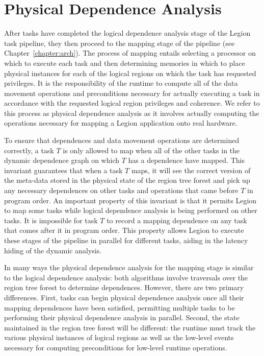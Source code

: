 

\chapter{Physical Dependence Analysis}
\label{chapter:physical}

After tasks have completed the logical dependence
analysis stage of the Legion task pipeline, they
then proceed to the mapping stage of the pipeline
(see Chapter~\ref{chapter:arch}). The process
of mapping entails selecting a processor on which
to execute each task and then determining memories
in which to place physical instances for each
of the logical regions on which the task has requested
privileges. It is the responsibility of the runtime
to compute all of the data movement operations and
preconditions necessary for actually executing a
task in accordance with the requested logical 
region privileges and coherence. We refer to this
process as physical dependence analysis as it 
involves actually computing the operations necessary
for mapping a Legion application onto real hardware.

To ensure that dependences and data movement 
operations are determined correctly, a task $T$ 
is only allowed to map when all of the other tasks 
in the dynamic dependence graph on which $T$
has a dependence have mapped. This invariant
guarantees that when a task $T$ maps, it
will see the correct version of the meta-data
stored in the physical state of the region
tree forest and pick up any necessary dependences
on other tasks and operations that came before
$T$ in program order. An important property of
this invariant is that it permits Legion to 
map some tasks while logical dependence
analysis is being performed on other tasks. It
is impossible for task $T$ to record a mapping
dependence on any task that comes after it in
program order. This property allows Legion to
execute these stages of the pipeline in parallel 
for different tasks, aiding in the
latency hiding of the dynamic analysis.

In many ways the physical dependence analysis
for the mapping stage is similar to the logical 
dependence analysis: both algorithms involve 
traversals over the region tree forest to determine
dependences. However, there are two primary differences. 
First, tasks can begin physical dependence
analysis once all their mapping dependences
have been satisfied, permitting multiple tasks to 
be performing their physical dependence analysis
in parallel. Second, the state maintained in
the region tree forest will be different: the
runtime must track the various physical instances
of logical regions as well as the low-level events 
necessary for computing preconditions for low-level
runtime operations.

